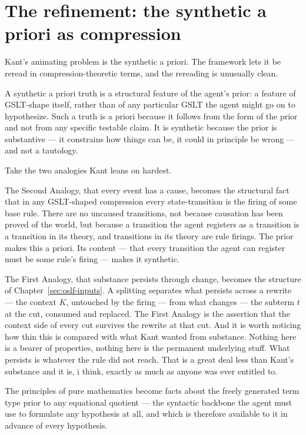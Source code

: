 \section{The refinement: the synthetic a priori as compression}
\label{sec:kant-refinement}

Kant's animating problem is the synthetic a priori.
The framework lets it be reread in compression-theoretic terms, and
the rereading is unusually clean.

A synthetic a priori truth is a structural feature of the agent's
prior: a feature of GSLT-shape itself, rather than of any
particular GSLT the agent might go on to hypothesize.
Such a truth is a priori because it follows from the form of the
prior and not from any specific testable claim.
It is synthetic because the prior is substantive --- it constrains
how things can be, it could in principle be wrong --- and not a
tautology.

Take the two analogies Kant leans on hardest.

The Second Analogy, that every event has a cause, becomes the
structural fact that in any GSLT-shaped compression every
state-transition is the firing of some base rule.
There are no uncaused transitions, not because causation has been
proved of the world, but because a transition the agent registers
as a transition is a transition in its theory, and transitions in
its theory are rule firings.
The prior makes this a priori.
Its content --- that every transition the agent can register must
be some rule's firing --- makes it synthetic.

The First Analogy, that substance persists through change, becomes
the structure of Chapter~\ref{sec:oslf-inputs}.
A splitting separates what persists across a rewrite --- the
context $K$, untouched by the firing --- from what changes --- the
subterm $t$ at the cut, consumed and replaced.
The First Analogy is the assertion that the context side of every
cut survives the rewrite at that cut.
And it is worth noticing how thin this is compared with what Kant
wanted from substance.
Nothing here is a bearer of properties, nothing here is the
permanent underlying stuff.
What persists is whatever the rule did not reach.
That is a great deal less than Kant's substance and it is, i think,
exactly as much as anyone was ever entitled to.

The principles of pure mathematics become facts about the freely
generated term type prior to any equational quotient --- the
syntactic backbone the agent must use to formulate any hypothesis
at all, and which is therefore available to it in advance of every
hypothesis.

